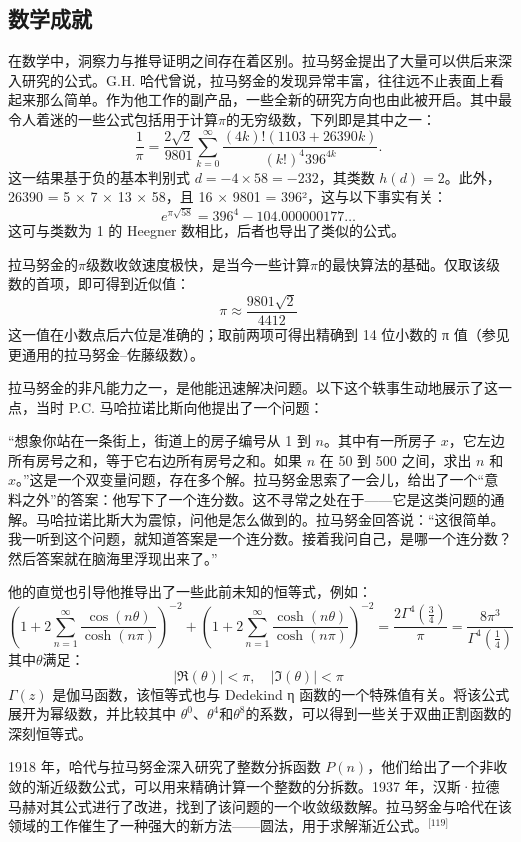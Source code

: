 \subsection{数学成就}
在数学中，洞察力与推导证明之间存在着区别。拉马努金提出了大量可以供后来深入研究的公式。G.H. 哈代曾说，拉马努金的发现异常丰富，往往远不止表面上看起来那么简单。作为他工作的副产品，一些全新的研究方向也由此被开启。其中最令人着迷的一些公式包括用于计算$\pi$的无穷级数，下列即是其中之一：
$$
\frac{1}{\pi} = \frac{2\sqrt{2}}{9801} \sum_{k=0}^{\infty} \frac{(4k)!(1103 + 26390k)}{(k!)^4 396^{4k}}.~
$$
这一结果基于负的基本判别式 $d = -4 \times 58 = -232$，其类数 $h(d) = 2$。此外，26390 = 5 × 7 × 13 × 58，且 16 × 9801 = 396²，这与以下事实有关：
$$
e^{\pi \sqrt{58}} = 396^4 - 104.000000177\ldots~
$$
这可与类数为 1 的 Heegner 数相比，后者也导出了类似的公式。

拉马努金的$\pi$级数收敛速度极快，是当今一些计算$\pi$的最快算法的基础。仅取该级数的首项，即可得到近似值：
$$
\pi \approx \frac{9801\sqrt{2}}{4412}~
$$
这一值在小数点后六位是准确的；取前两项可得出精确到 14 位小数的 π 值（参见更通用的拉马努金–佐藤级数）。

拉马努金的非凡能力之一，是他能迅速解决问题。以下这个轶事生动地展示了这一点，当时 P.C. 马哈拉诺比斯向他提出了一个问题：

“想象你站在一条街上，街道上的房子编号从 1 到 $n$。其中有一所房子 $x$，它左边所有房号之和，等于它右边所有房号之和。如果 $n$ 在 50 到 500 之间，求出 $n$ 和 $x$。”这是一个双变量问题，存在多个解。拉马努金思索了一会儿，给出了一个“意料之外”的答案：他写下了一个连分数。这不寻常之处在于——它是这类问题的通解。马哈拉诺比斯大为震惊，问他是怎么做到的。拉马努金回答说：“这很简单。我一听到这个问题，就知道答案是一个连分数。接着我问自己，是哪一个连分数？然后答案就在脑海里浮现出来了。”

他的直觉也引导他推导出了一些此前未知的恒等式，例如：
$$
\left(1+2\sum_{n=1}^{\infty} \frac{\cos(n\theta)}{\cosh(n\pi)}\right)^{-2}
+
\left(1+2\sum_{n=1}^{\infty} \frac{\cosh(n\theta)}{\cosh(n\pi)}\right)^{-2}
=
\frac{2\Gamma^4\left(\frac{3}{4}\right)}{\pi}
=
\frac{8\pi^3}{\Gamma^4\left(\frac{1}{4}\right)}~
$$
其中$\theta$满足：
$$
|\Re(\theta)| < \pi,\quad |\Im(\theta)| < \pi~
$$
$\Gamma(z)$ 是伽马函数，该恒等式也与 Dedekind η 函数的一个特殊值有关。将该公式展开为幂级数，并比较其中 $\theta^0$、$\theta^4$和$\theta^8$的系数，可以得到一些关于双曲正割函数的深刻恒等式。

1918 年，哈代与拉马努金深入研究了整数分拆函数 $P(n)$，他们给出了一个非收敛的渐近级数公式，可以用来精确计算一个整数的分拆数。1937 年，汉斯·拉德马赫对其公式进行了改进，找到了该问题的一个收敛级数解。拉马努金与哈代在该领域的工作催生了一种强大的新方法——圆法，用于求解渐近公式。\(^\text{[119]}\)

